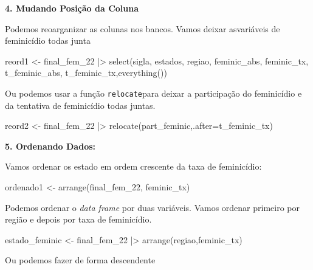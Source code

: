 \documentclass[
  letterpaper,
  DIV=11,
  numbers=noendperiod]{scrreprt}
\newenvironment{Shaded}{\begin{snugshade}}{\end{snugshade}}
\newcommand{\AttributeTok}[1]{\textcolor[rgb]{0.40,0.45,0.13}{#1}}
\newcommand{\FunctionTok}[1]{\textcolor[rgb]{0.28,0.35,0.67}{#1}}
\newcommand{\NormalTok}[1]{\textcolor[rgb]{0.00,0.23,0.31}{#1}}
\newcommand{\OtherTok}[1]{\textcolor[rgb]{0.00,0.23,0.31}{#1}}
\newcommand{\SpecialCharTok}[1]{\textcolor[rgb]{0.37,0.37,0.37}{#1}}
\begin{document}
\textbf{4. Mudando Posição da Coluna}

Podemos reoarganizar as colunas nos bancos. Vamos deixar asvariáveis de
feminicídio todas junta

\begin{Shaded}
\begin{Highlighting}[]
\NormalTok{reord1 }\OtherTok{\textless{}{-}}\NormalTok{ final\_fem\_22 }\SpecialCharTok{|\textgreater{}} 
  \FunctionTok{select}\NormalTok{(sigla, estados, regiao, feminic\_abs, feminic\_tx, t\_feminic\_abs, t\_feminic\_tx,}\FunctionTok{everything}\NormalTok{())}
\end{Highlighting}
\end{Shaded}

Ou podemos usar a função \texttt{relocate}para deixar a participação do
feminicídio e da tentativa de feminicídio todas juntas.

\begin{Shaded}
\begin{Highlighting}[]
\NormalTok{reord2 }\OtherTok{\textless{}{-}}\NormalTok{ final\_fem\_22 }\SpecialCharTok{|\textgreater{}} 
  \FunctionTok{relocate}\NormalTok{(part\_feminic,}\AttributeTok{.after=}\NormalTok{t\_feminic\_tx)}
\end{Highlighting}
\end{Shaded}

\textbf{5. Ordenando Dados:}

Vamos ordenar os estado em ordem crescente da taxa de feminicídio:

\begin{Shaded}
\begin{Highlighting}[]
\NormalTok{ordenado1 }\OtherTok{\textless{}{-}} \FunctionTok{arrange}\NormalTok{(final\_fem\_22, feminic\_tx)}
\end{Highlighting}
\end{Shaded}

Podemos ordenar o \emph{data frame} por duas variáveis. Vamos ordenar
primeiro por região e depois por taxa de feminicídio.

\begin{Shaded}
\begin{Highlighting}[]
\NormalTok{estado\_feminic }\OtherTok{\textless{}{-}}\NormalTok{ final\_fem\_22 }\SpecialCharTok{|\textgreater{}} 
  \FunctionTok{arrange}\NormalTok{(regiao,feminic\_tx)}
\end{Highlighting}
\end{Shaded}

Ou podemos fazer de forma descendente
\end{document}
